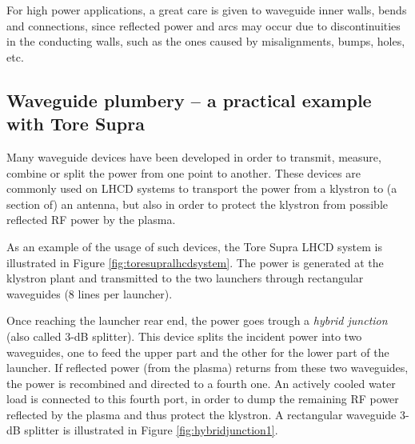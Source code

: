 For high power applications, a great care is given to waveguide inner walls, bends and connections, since reflected power and arcs may occur due to discontinuities in the conducting walls, such as the ones caused by misalignments, bumps, holes, etc.



\subsection{Waveguide plumbery – a practical example with Tore Supra}
Many waveguide devices have been developed in order to transmit, measure, combine or split the power from one point to another. These devices are commonly used on LHCD systems to transport the power from a klystron to (a section of) an antenna, but also in order to protect the klystron from possible reflected RF power by the plasma.   

As an example of the usage of such devices, the Tore Supra LHCD system is illustrated in Figure \ref{fig:toresupralhcdsystem}. The power is generated at the klystron plant and transmitted to the two launchers through rectangular waveguides (8 lines per launcher). 



Once reaching the launcher rear end, the power goes trough a \textit{hybrid junction} (also called 3-dB splitter). This device splits the incident power into two waveguides, one to feed the upper part and the other for the lower part of the launcher.  If reflected power (from the plasma) returns from these two waveguides, the power is recombined and directed to a fourth one. An actively cooled water load is connected to this fourth port, in order to dump the remaining RF power reflected by the plasma and thus protect the klystron. A rectangular waveguide 3-dB splitter is illustrated in Figure \ref{fig:hybridjunction1}. 



